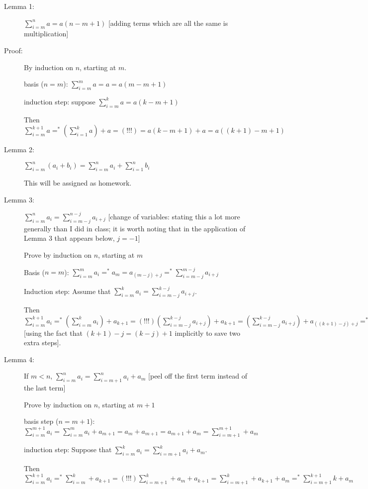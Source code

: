 \documentclass[12pt]{article}
\begin{document}
\begin{description}

\item[Lemma 1:] $\sum_{i=m}^n a = a(n-m+1)$  [adding terms which are all the same is multiplication]

\item[Proof:]  By induction on $n$, starting at $m$.

basis ($n=m$):  $\sum_{i=m}^m a = a = a(m-m+1)$

induction step:  suppose $\sum_{i=m}^{k}a = a(k-m+1)$

Then $\sum_{i=m}^{k+1} a =^* (\sum_{i=1}^k a) + a=(!!!)=a(k-m+1)+a = a((k+1)-m+1)$

\item[Lemma 2:]  $\sum_{i=m}^n (a_i + b_i) = \sum_{i=m}^n a_i + \sum_{i=1}^n b_i$

This will be assigned as homework.

\item[Lemma 3:]  $\sum_{i=m}^n a_i = \sum_{i=m-j}^{n-j} a_{i+j}$ [change of variables:  stating this a lot more generally than I did in class; it is worth noting that in the application of Lemma 3 that appears below, $j=-1$]

Prove by induction on $n$, starting at $m$

Basis ($n=m$):  $\sum_{i=m}^m a_i =^* a_m = a_{(m-j)+j} =^* \sum_{i=m-j}^{m-j} a_{i+j}$

Induction step:  Assume that $\sum_{i=m}^k a_i = \sum_{i=m-j}^{k-j} a_{i+j}$.

Then $\sum_{i=m}^{k+1} a_i =^* (\sum_{i=m}^k a_i)+a_{k+1}=(!!!) (\sum_{i=m-j}^{k-j} a_{i+j})+a_{k+1}=(\sum_{i=m-j}^{k-j} a_{i+j})+a_{((k+1)-j)+j}=^*\sum_{i=m-j}^{(k+1)-j} a_{i+j}$ [using the fact that $(k+1)-j = (k-j)+1$ implicitly to save two extra steps].

\item[Lemma 4:]  If $m<n$, $\sum_{i=m}^n a_i = \sum_{i=m+1}^n a_i + a_m$  [peel off the first term instead of the last term]

Prove by induction on $n$, starting at $m+1$

basis step ($n=m+1$):  $\sum_{i=m}^{m+1} a_i = \sum_{i=m}^m a_i + a_{m+1} = a_m + a_{m+1} = a_{m+1}+a_m = \sum_{i=m+1}^{m+1}+a_m$

induction step:  Suppose that $\sum_{i=m}^k a_i = \sum_{i=m+1}^k a_i + a_m$.

Then $\sum_{i=m}^{k+1} a_i =^* \sum_{i=m}^k + a_{k+1} =(!!!) \sum_{i=m+1}^k + a_m + a_{k+1} = \sum_{i=m+1}^k + a_{k+1} + a_m =^* \sum_{i=m+1}^{k+1}k + a_m $


\end{description}
\end{document}
